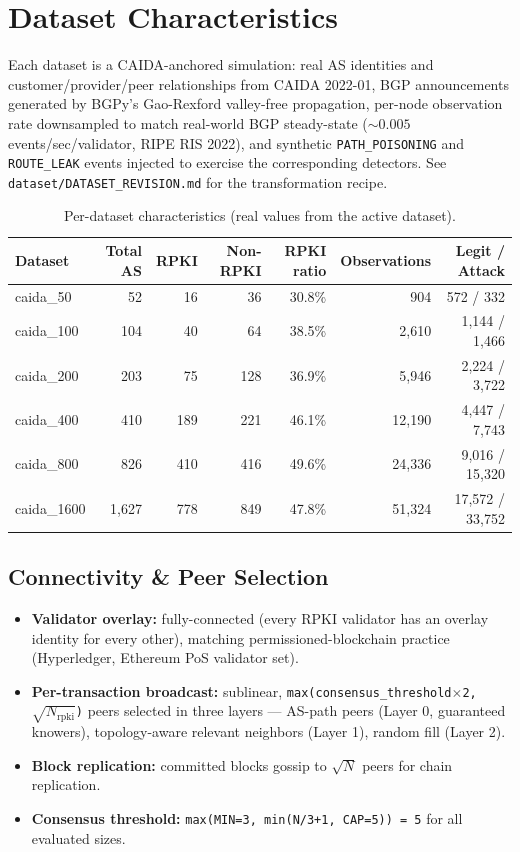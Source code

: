 \documentclass[10pt,a4paper]{article}
\begin{document}
\newpage
\section{Dataset Characteristics}
\label{sec:datasets}

Each dataset is a CAIDA-anchored simulation: real AS identities and
customer/provider/peer relationships from CAIDA 2022-01, BGP announcements
generated by BGPy's Gao-Rexford valley-free propagation, per-node
observation rate downsampled to match real-world BGP steady-state
($\sim 0.005$ events/sec/validator, RIPE RIS 2022), and synthetic
\texttt{PATH\_POISONING} and \texttt{ROUTE\_LEAK} events injected to
exercise the corresponding detectors. See
\texttt{dataset/DATASET\_REVISION.md} for the transformation recipe.

\begin{table}[h]
\centering
\caption{Per-dataset characteristics (real values from the active dataset).}
\begin{tabular}{lrrrrrr}
\toprule
Dataset & Total AS & RPKI & Non-RPKI & RPKI ratio & Observations & Legit / Attack \\
\midrule

caida\_50 & 52 & 16 & 36 & 30.8\% & 904 & 572 / 332 \\
caida\_100 & 104 & 40 & 64 & 38.5\% & 2,610 & 1,144 / 1,466 \\
caida\_200 & 203 & 75 & 128 & 36.9\% & 5,946 & 2,224 / 3,722 \\
caida\_400 & 410 & 189 & 221 & 46.1\% & 12,190 & 4,447 / 7,743 \\
caida\_800 & 826 & 410 & 416 & 49.6\% & 24,336 & 9,016 / 15,320 \\
caida\_1600 & 1,627 & 778 & 849 & 47.8\% & 51,324 & 17,572 / 33,752 \\
\bottomrule
\end{tabular}
\end{table}

\subsection{Connectivity \& Peer Selection}

\begin{itemize}
\item \textbf{Validator overlay:} fully-connected (every RPKI validator has an overlay identity for every other), matching permissioned-blockchain practice (Hyperledger, Ethereum PoS validator set).
\item \textbf{Per-transaction broadcast:} sublinear, \texttt{max(consensus\_threshold$\times$2, $\sqrt{N_{\text{rpki}}}$)} peers selected in three layers --- AS-path peers (Layer 0, guaranteed knowers), topology-aware relevant neighbors (Layer 1), random fill (Layer 2).
\item \textbf{Block replication:} committed blocks gossip to $\sqrt{N}$ peers for chain replication.
\item \textbf{Consensus threshold:} \texttt{max(MIN=3, min(N/3+1, CAP=5)) = 5} for all evaluated sizes.
\end{itemize}
\end{document}
